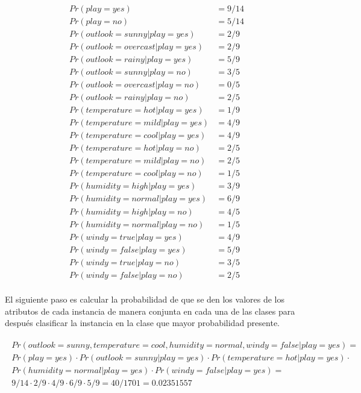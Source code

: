 \documentclass{article}
\begin{document}
		\begin{align}
			Pr(play = yes) &= 9/14 \\
			Pr(play = no) &= 5/14 \\
			Pr(outlook = sunny 		| play = yes) &= 2/9 \\
			Pr(outlook = overcast | play = yes) &= 2/9 \\
			Pr(outlook = rainy 		| play = yes) &= 5/9 \\
			Pr(outlook = sunny 		| play = no) &= 3/5 \\
			Pr(outlook = overcast | play = no) &= 0/5 \\
			Pr(outlook = rainy 		| play = no) &= 2/5 \\
			Pr(temperature = hot 	| play = yes) &= 1/9 \\
			Pr(temperature = mild | play = yes) &= 4/9 \\
			Pr(temperature = cool | play = yes) &= 4/9 \\
			Pr(temperature = hot 	| play = no) &= 2/5 \\
			Pr(temperature = mild | play = no) &= 2/5 \\
			Pr(temperature = cool | play = no) &= 1/5 \\
			Pr(humidity = high 		| play = yes) &= 3/9 \\
			Pr(humidity = normal 	| play = yes) &= 6/9 \\
			Pr(humidity = high		| play = no) &= 4/5 \\
			Pr(humidity = normal 	| play = no) &= 1/5 \\
			Pr(windy = true 			|	 play = yes) &= 4/9 \\
			Pr(windy = false 			| play = yes) &= 5/9 \\
			Pr(windy = true 			| play = no) &= 3/5 \\
			Pr(windy = false 			| play = no) &= 2/5
		\end{align}

		\paragraph{}
		El siguiente paso es calcular la probabilidad de que se den los valores de los atributos de cada instancia de manera conjunta en cada una de las clases para después clasificar la instancia en la clase que mayor probabilidad presente.

		\begin{align}
			\begin{split}
				Pr(outlook = sunny, temperature = cool, humidity = normal, windy = false | play = yes) = \\
				Pr(play = yes) \cdot Pr(outlook = sunny | play = yes) \cdot Pr(temperature = hot 	| play = yes) \cdot \\
				Pr(humidity = normal 	| play = yes) \cdot Pr(windy = false 	| play = yes) = \\
				9/14 \cdot 2/9 \cdot 4/9 \cdot 6/9 \cdot 5/9 = 40/1701 = 0.02351557
			\end{split}
		\end{align}
\end{document}

